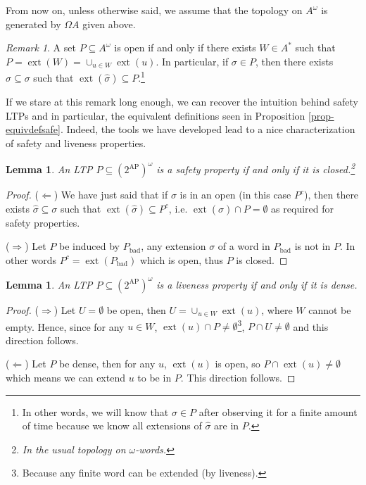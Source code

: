 \documentclass{tufte-handout} %
\newtheorem{lem}[thm]{Lemma}
\theoremstyle{definition}
\theoremstyle{remark}
\newtheorem{rem}[thm]{Remark}
\newcommand{\0}{\textsf{0}}
\newcommand{\1}{\textsf{1}}
\newcommand{\AP}{\text{AP}}
\DeclareMathOperator{\ext}{ext}
\begin{document}
From now on, unless otherwise said, we assume that the topology on $A^{\omega}$ is generated by $\Omega A$ given above.
\begin{rem}\label{rem-openchar}
	A set $P \subseteq A^{\omega}$ is open if and only if there exists $W \in A^*$ such that $P = \ext(W) = \cup_{u \in W} \ext(u)$. In particular, if $\sigma \in P$, then there exists $\hat{\sigma} \subseteq \sigma$ such that $\ext(\hat{\sigma}) \subseteq P$.\footnote{In other words, we will know that $\sigma \in P$ after observing it for a finite amount of time because we know all extensions of $\hat{\sigma}$ are in $P$.}
	
\end{rem}
If we stare at this remark long enough, we can recover the intuition behind safety LTPs and in particular, the equivalent definitions seen in Proposition \ref{prop-equivdefsafe}. Indeed, the tools we have developed lead to a nice characterization of safety and liveness properties.
\begin{lem}
	An LTP $P \subseteq (2^{\AP})^{\omega}$ is a safety property if and only if it is closed.\footnote{In the usual topology on $\omega$-words.}
\end{lem}
\begin{proof}
	($\Leftarrow$) We have just said that if $\sigma$ is in an open (in this case $P^c$), then there exists $\hat{\sigma} \subseteq \sigma$ such that $\ext(\hat{\sigma}) \subseteq P^c$, i.e. $\ext(\hat{\sigma}) \cap P = \emptyset$ as required for safety properties.
	
	($\Rightarrow$) Let $P$ be induced by $P_{\text{bad}}$, any extension $\sigma$ of a word in $P_{\text{bad}}$ is not in $P$. In other words $P^c = \ext(P_{\text{bad}})$ which is open, thus $P$ is closed.
\end{proof}
\begin{lem}
	An LTP $P \subseteq (2^{\AP})^{\omega}$ is a liveness property if and only if it is dense.
\end{lem}
\begin{proof}
	($\Rightarrow$) Let $U =\emptyset$ be open, then $U = \cup_{u \in W} \ext(u)$, where $W$ cannot be empty. Hence, since for any $u \in W$, $\ext(u) \cap P \neq \emptyset$\footnote{Because any finite word can be extended (by liveness).}, $P\cap U \neq \emptyset$ and this direction follows.
	
	($\Leftarrow$) Let $P$ be dense, then for any $u$, $\ext(u)$ is open, so $P\cap \ext(u) \neq \emptyset$ which means we can extend $u$ to be in $P$. This direction follows.
\end{proof}
\end{document}

